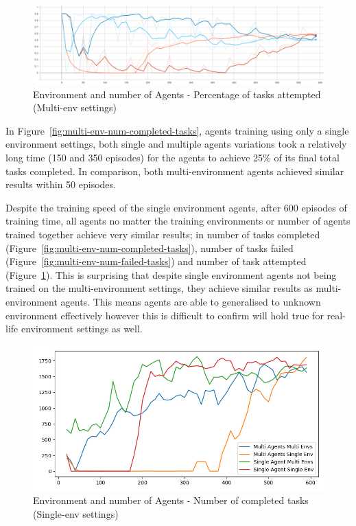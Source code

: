 \begin{figure}[H]
    \centering
    \includegraphics[width=\linewidth]{figures/5_evaluation_figs/env_agent_num_training_fig/percent_tasks.png}
    \caption{Environment and number of Agents - Percentage of tasks attempted (Multi-env settings)}
    \label{fig:multi-env-percent-tasks}
\end{figure}

In Figure~\ref{fig:multi-env-num-completed-tasks}, agents training using only a single environment settings, both
single and multiple agents variations took a relatively long time (150 and 350 episodes) for the agents to achieve 25\%
of its final total tasks completed. In comparison, both multi-environment agents achieved similar results within 50
episodes.

Despite the training speed of the single environment agents, after 600 episodes of training time, all agents no matter
the training environments or number of agents trained together achieve very similar results; in number of tasks
completed (Figure~\ref{fig:multi-env-num-completed-tasks}), number of tasks failed
(Figure~\ref{fig:multi-env-num-failed-tasks}) and number of task attempted (Figure~\ref{fig:multi-env-percent-tasks}).
This is surprising that despite single environment agents not being trained on the multi-environment settings, they
achieve similar results as multi-environment agents. This means agents are able to generalised to unknown environment
effectively however this is difficult to confirm will hold true for real-life environment settings as well.

\begin{figure}[H]
    \centering
    \includegraphics[width=\linewidth]{figures/5_evaluation_figs/env_agent_num_training_fig/single_env_num_completed_tasks.png}
    \caption{Environment and number of Agents - Number of completed tasks (Single-env settings)}
    \label{fig:single-env-num-completed-tasks}
\end{figure}

